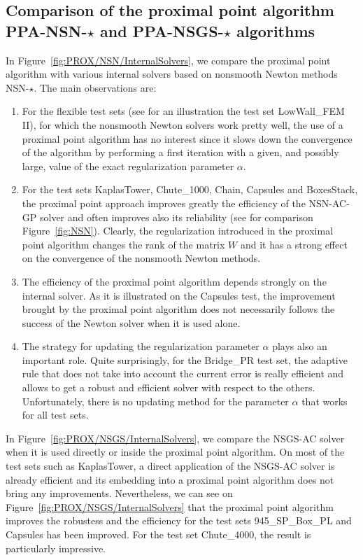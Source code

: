 \subsection{Comparison of the proximal point algorithm {\sf PPA-NSN-$\star$} and {\sf PPA-NSGS-$\star$}  algorithms}
\label{Sec:PROX/NSN/InternalSolvers}
In Figure~\ref{fig:PROX/NSN/InternalSolvers}, we compare the proximal point algorithm with various internal solvers based on nonsmooth Newton methods {\sf NSN-$\star$}. The main observations are:
\begin{enumerate}
\item For the flexible test sets (see for an illustration the test set LowWall\_FEM II), for which the nonsmooth Newton solvers work pretty well, the use of a proximal point algorithm has no interest since it slows down the convergence of the algorithm by performing a first iteration with a given, and possibly large, value of the exact regularization parameter $\alpha$.
\item For the test sets KaplasTower,   Chute\_1000, Chain, Capsules and BoxesStack, the proximal point approach improves greatly the efficiency  of the {\sf NSN-AC-GP} solver and often improves also its reliability (see for comparison Figure~\ref{fig:NSN}). Clearly, the regularization introduced in the proximal point algorithm changes the rank of the matrix $W$ and it has a strong effect on the convergence of the nonsmooth  Newton methods.
\item The efficiency of the proximal point algorithm depends strongly  on the internal solver. As it is illustrated on the Capsules test, the improvement brought by the proximal point algorithm does not necessarily follows the success of the Newton solver when it is used alone.
\item The strategy for updating the regularization parameter $\alpha$ plays also an important role. Quite surprisingly, for the Bridge\_PR test set, the adaptive rule that does not take into account the current error is really efficient and allows to get a robust and efficient solver with respect to the others. Unfortunately, there is no updating method for the parameter $\alpha$ that works for all test sets.
\end{enumerate}
In Figure~\ref{fig:PROX/NSGS/InternalSolvers}, we compare the {\sf NSGS-AC} solver when it is used directly or inside the proximal point algorithm. On most of the test sets such as KaplasTower, a direct application of the {\sf NSGS-AC} solver is already efficient and its embedding into a proximal point algorithm does not bring any improvements. Nevertheless, we can see on Figure~\ref{fig:PROX/NSGS/InternalSolvers} that the proximal point algorithm improves the robustess and the efficiency for the test sets 945\_SP\_Box\_PL  and Capsules has been improved. For the test set Chute\_4000, the result is particularly impressive.

